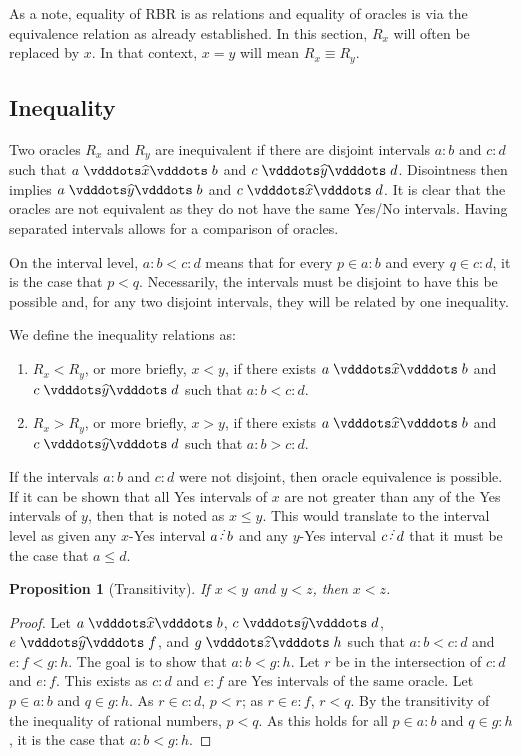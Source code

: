 \documentclass[12pt]{article}
\newtheorem{proposition}{Proposition}[section]
\begin{document}
As a note, equality of RBR is as relations and equality of oracles is via the equivalence relation as already established. In this section, $R_x$ will often be replaced by $x$. In that context, $x = y$ will mean $R_x \equiv R_y$. 

\subsection{Inequality}

Two oracles $R_x$ and $R_y$ are inequivalent if there are disjoint intervals $a:b$ and $c:d$ such that $a \xora b$ and $c \xora[y] d$. Disointness then implies \sout{$a \xora[y] b$} and \sout{$c \xora d$}. It is clear that the oracles are not equivalent as they do not have the same Yes/No intervals. Having separated intervals allows for a comparison of oracles. 

On the interval level, $a:b < c:d$ means that for every $p \in a:b$ and every $q \in c:d$, it is the case that $p < q$. Necessarily, the intervals must be disjoint to have this be possible and, for any two disjoint intervals, they will be related by one inequality. 

We define the inequality relations as:
\begin{enumerate}
    \item $R_x < R_y$, or more briefly, $x < y$, if there exists $a \xora b$ and $c \xora[y] d$ such that $a:b<c:d$.
    \item $R_x > R_y$, or more briefly, $x > y$, if there exists $a \xora b$ and $c \xora[y] d$ such that $a:b > c:d$.
\end{enumerate}

If the intervals $a:b$ and $c:d$ were not disjoint, then oracle equivalence is possible. If it can be shown that all Yes intervals of $x$ are not greater than any of the Yes intervals of $y$, then that is noted as $x \leq y$. This would translate to the interval level as given any $x$-Yes interval $a \lte b$ and any $y$-Yes interval $c \lte d$ that it must be the case that $a \leq d$. 

\begin{proposition}[Transitivity]
    If $x <y$ and $y<z$, then $x < z$.
\end{proposition}

\begin{proof}
    Let $a \xora b$, $c \xora[y] d$, $e \xora[y] f$, and $g \xora[z] h$ such that $a:b < c:d$ and $e:f < g:h$. The goal is to show that $a:b < g:h$. Let $r$ be in the intersection of $c:d$ and $e:f$. This exists as $c:d$ and $e:f$ are Yes intervals of the same oracle. Let $p \in a:b$ and $q \in g:h$. As $r \in c:d$, $p < r$; as $r \in e:f$, $r < q$. By the transitivity of the inequality of rational numbers, $p < q$. As this holds for all $p \in a:b$ and $q \in g:h$, it is the case that $a:b <g:h$.
\end{proof}
\end{document}
